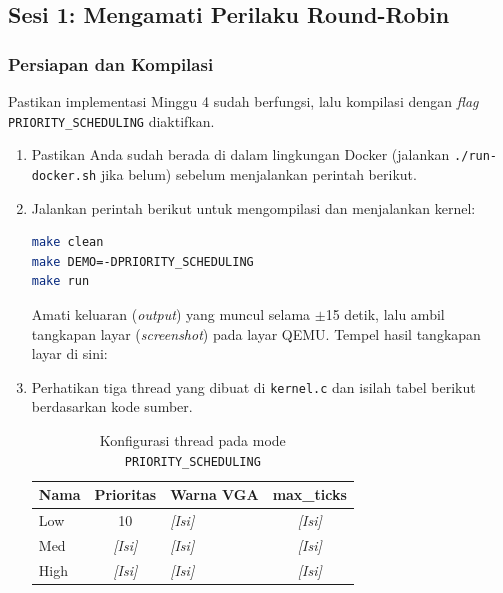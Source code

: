 \subsection{Sesi 1: Mengamati Perilaku Round-Robin}

\subsubsection{Persiapan dan Kompilasi}

Pastikan implementasi Minggu 4 sudah berfungsi, lalu kompilasi dengan \textit{flag} \texttt{PRIORITY\_SCHEDULING} diaktifkan.

\begin{enumerate}

	\item Pastikan Anda sudah berada di dalam lingkungan Docker (jalankan \texttt{./run-docker.sh} jika belum) sebelum menjalankan perintah berikut.

	\item Jalankan perintah berikut untuk mengompilasi dan menjalankan kernel:
	      \begin{lstlisting}[language=bash, caption={Compile dan jalankan demo Priority Scheduling}]
make clean
make DEMO=-DPRIORITY_SCHEDULING
make run
    \end{lstlisting}

	      Amati keluaran (\textit{output}) yang muncul selama $\pm$15 detik, lalu ambil tangkapan layar (\textit{screenshot}) pada layar QEMU. Tempel hasil tangkapan layar di sini:


	\item Perhatikan tiga thread yang dibuat di \texttt{kernel.c} dan isilah tabel berikut berdasarkan kode sumber.

	      \begin{table}[htbp]
		      \centering
		      \caption{Konfigurasi thread pada mode \texttt{PRIORITY\_SCHEDULING}}
		      \begin{tabulary}{\textwidth}{|l|c|l|c|}
			      \hline
			      \textbf{Nama} & \textbf{Prioritas} & \textbf{Warna VGA} & \textbf{max\_ticks} \\ \hline
			      Low  & 10 & \textit{[Isi]} & \textit{[Isi]} \\ \hline
			      Med  & \textit{[Isi]} & \textit{[Isi]} & \textit{[Isi]} \\ \hline
			      High & \textit{[Isi]} & \textit{[Isi]} & \textit{[Isi]} \\ \hline
		      \end{tabulary}
	      \end{table}

\end{enumerate}

